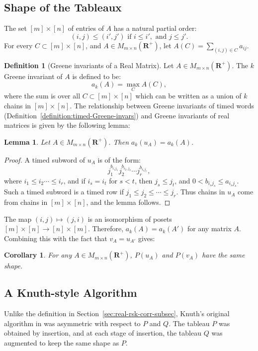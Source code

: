 \documentclass[12pt]{amsart}
\newtheorem{lemma}[theorem]{Lemma}
\newtheorem{corollary}[theorem]{Corollary}
\theoremstyle{definition}
\newtheorem{definition}[theorem]{Definition}
\newcommand{\RR}{\mathbf R}
\begin{document}
\subsection{Shape of the Tableaux}
\label{sec:shape-of-tableaux}
The set $[m]\times [n]$ of entries of $A$ has a natural partial order:
\begin{displaymath}
  (i,j)\leq (i',j') \text{ if } i\leq i',\text{ and } j\leq j'.
\end{displaymath}
For every $C\subset [m]\times [n]$, and $A\in M_{m\times n}(\RR^+)$, let $A(C)=\sum_{(i,j)\in C} a_{ij}$.
\begin{definition}
  [Greene invariants of a Real Matrix]
  Let $A\in M_{m\times n}(\RR^+)$.
  The $k$ Greene invariant of $A$ is defined to be:
  \begin{displaymath}
    a_k(A) = \max_C A(C),
  \end{displaymath}
  where the sum is over all $C\subset [m]\times [n]$ which can be written as a union of $k$ chains in $[m]\times[n]$.
  The relationship between Greene invariants of timed words (Definition~\ref{definition:timed-Greene-invars}) and Greene invariants of real matrices is given by the following lemma:
\end{definition}
\begin{lemma}
  \label{lemma:Greene-matrix-word}
  Let $A\in M_{m\times n}(\RR^+)$.
  Then $a_k(u_A)=a_k(A)$.
\end{lemma}
\begin{proof}
  A timed subword of $u_A$ is of the form:
  \begin{displaymath}
    j_1^{b_{i_1j_1}} j_2^{b_{i_2,j_2}} \dotsb j_r^{b_{i_rj_r}},
  \end{displaymath}
  where $i_1\leq i_2 \dotsb \leq i_r$, and if $i_s=i_t$ for $s<t$, then $j_s\leq j_t$, and $0<b_{i_sj_s}\leq a_{i_sj_s}$.
  Such a timed subword is a timed row if $j_1\leq j_2 \leq \dotsb \leq j_r$.
  Thus chains in $u_A$ come from chains in $[m]\times[n]$, and the lemma follows.
\end{proof}
The map $(i,j)\mapsto (j,i)$ is an isomorphism of posets $[m]\times [n]\to [n]\times [m]$.
Therefore, $a_k(A)=a_k(A')$ for any matrix $A$.
Combining this with the fact that $v_A=u_{A'}$ gives:
\begin{corollary}
  \label{lemma:same-shape}
  For any $A\in M_{m\times n}(\RR^+)$, $P(u_A)$ and $P(v_A)$ have the same shape.
\end{corollary}
\subsection{A Knuth-style Algorithm}
\label{sec:knuth-style}
Unlike the definition in Section~\ref{sec:real-rsk-corr-subsec}, Knuth's original algorithm in \cite{knuth} was asymmetric with respect to $P$ and $Q$.
The tableau $P$ was obtained by insertion, and at each stage of insertion, the tableau $Q$ was augmented to keep the same shape as $P$.
\end{document}
